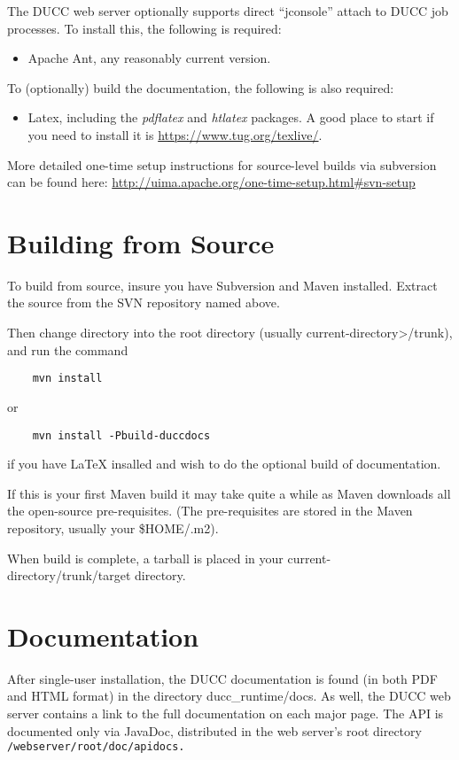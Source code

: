 The DUCC web server optionally supports direct ``jconsole'' attach to DUCC job processes.  To install
this, the following is required:
\begin{itemize}
    \item Apache Ant, any reasonably current version.
\end{itemize}
    
To (optionally) build the documentation, the following is also required:
\begin{itemize}
  \item Latex, including the \emph{pdflatex} and \emph{htlatex} packages.  A good place
    to start if you need to install it is \url{https://www.tug.org/texlive/}.
\end{itemize}

More detailed one-time setup instructions for source-level builds via subversion can be found here:
\url{http://uima.apache.org/one-time-setup.html\#svn-setup}

\section{Building from Source}

To build from source, insure you have
Subversion and Maven installed.  Extract the source from the SVN repository named above. 

Then change directory into
the root directory (usually current-directory>/trunk), and run the command
\begin{verbatim}
    mvn install
\end{verbatim}
or
\begin{verbatim}
    mvn install -Pbuild-duccdocs
\end{verbatim}
if you have LaTeX insalled and wish to do the optional build of documentation.

If this is your first Maven build it may take quite a while as Maven downloads all the
open-source pre-requisites.  (The pre-requisites are stored in the Maven repository, usually
your \$HOME/.m2).

When build is complete, a tarball is placed in your current-directory/trunk/target
directory.

\section{Documentation}
After single-user installation, the DUCC documentation is found (in both PDF and HTML format) in the directory 
ducc\_runtime/docs.  As well, the DUCC web server contains a link to the full documentation on each major page.
The API is documented only via JavaDoc, distributed in the web server's root directory 
{\tt \duccruntime/webserver/root/doc/apidocs.}  

